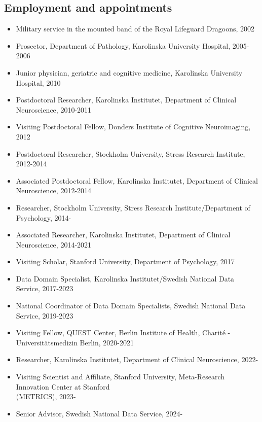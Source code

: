 \documentclass[10pt]{article}
\begin{document}
\subsection*{Employment and appointments}
\begin{itemize}[nolistsep]
\item Military service in the mounted band of the Royal Lifeguard Dragoons, 2002
\item Prosector, Department of Pathology, Karolinska University Hospital, 2005-2006
\item Junior physician, geriatric and cognitive medicine, Karolinska University Hospital, 2010
\item Postdoctoral Researcher, Karolinska Institutet, Department of Clinical Neuroscience, 2010-2011
\item Visiting Postdoctoral Fellow, Donders Institute of Cognitive Neuroimaging, 2012
\item Postdoctoral Researcher, Stockholm University, Stress Research Institute, 2012-2014
\item Associated Postdoctoral Fellow, Karolinska Institutet, Department of Clinical Neuroscience, 2012-2014
\item Researcher, Stockholm University, Stress Research Institute/Department of Psychology, 2014-
\item Associated Researcher, Karolinska Institutet, Department of Clinical Neuroscience, 2014-2021
\item Visiting Scholar, Stanford University, Department of Psychology, 2017
\item Data Domain Specialist, Karolinska Institutet/Swedish National Data Service, 2017-2023
\item National Coordinator of Data Domain Specialists, Swedish National Data Service, 2019-2023
\item Visiting Fellow, QUEST Center, Berlin Institute of Health, Charité - Universitätsmedizin Berlin, 2020-2021
\item Researcher, Karolinska Institutet, Department of Clinical Neuroscience, 2022-
\item Visiting Scientist and Affiliate, Stanford University, Meta-Research Innovation Center at Stanford\\ (METRICS), 2023-
\item Senior Advisor, Swedish National Data Service, 2024-
\end{itemize}
\end{document}
